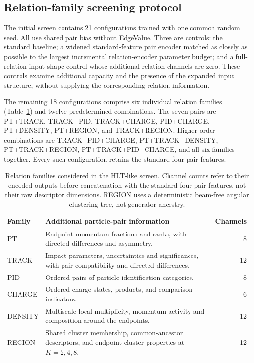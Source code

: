 \subsection{Relation-family screening protocol}
\label{sec:hlt-screen}

The initial screen contains 21 configurations trained with one common random seed. All use
shared pair bias without EdgeValue. Three are controls: the standard
baseline; a widened standard-feature pair encoder matched as closely as
possible to the largest incremental relation-encoder parameter budget; and
a full-relation input-shape control whose additional relation channels are
zero. These controls examine additional capacity and the presence of the
expanded input structure, without supplying the corresponding relation
information.

The remaining 18 configurations comprise six individual relation families
(Table~\ref{tab:relation-families}) and twelve predetermined combinations.
The seven pairs are PT+TRACK, TRACK+PID, TRACK+CHARGE, PID+CHARGE,
PT+DENSITY, PT+REGION, and TRACK+REGION. Higher-order combinations are
TRACK+PID+CHARGE, PT+TRACK+DENSITY, PT+TRACK+REGION,
PT+TRACK+PID+CHARGE, and all six families together. Every such configuration
retains the standard four pair features.

\begin{table}[htbp]
\centering
\small
\begin{tabularx}{\linewidth}{@{}lXr@{}}
\toprule
Family & Additional particle-pair information & Channels \\
\midrule
PT & Endpoint momentum fractions and ranks, with directed differences and asymmetry. & 8 \\
TRACK & Impact parameters, uncertainties and significances, with pair compatibility and directed differences. & 12 \\
PID & Ordered pairs of particle-identification categories. & 8 \\
CHARGE & Ordered charge states, products, and comparison indicators. & 6 \\
DENSITY & Multiscale local multiplicity, momentum activity and composition around the endpoints. & 12 \\
REGION & Shared cluster membership, common-ancestor descriptors, and endpoint cluster properties at $K=2,4,8$. & 12 \\
\bottomrule
\end{tabularx}
\caption{Relation families considered in the HLT-like screen. Channel counts
refer to their encoded outputs before concatenation with the standard four
pair features, not their raw descriptor dimensions. REGION uses a
deterministic beam-free angular clustering tree, not generator ancestry.}
\label{tab:relation-families}
\end{table}

